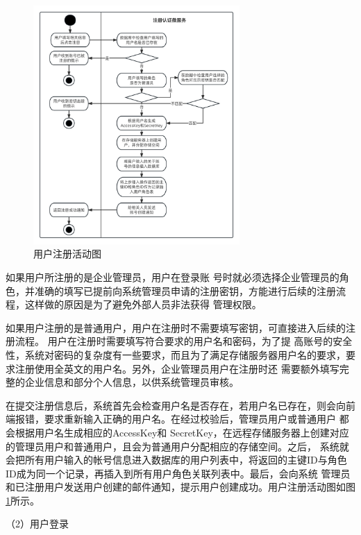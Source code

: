 \begin{figure}[h]
    \centering
    \includegraphics[width=0.7\textwidth]{my_figures/chapter4/用户注册活动图.png}
    \caption{用户注册活动图}
    \label{fig:用户注册活动图}
\end{figure}

如果用户所注册的是企业管理员，用户在登录账
号时就必须选择企业管理员的角色，并准确的填写已提前向系统管理员申请的注册密钥，方能进行后续的注册流程，这样做的原因是为了避免外部人员非法获得
管理权限。

如果用户注册的是普通用户，用户在注册时不需要填写密钥，可直接进入后续的注册流程。
用户在注册时需要填写符合要求的用户名和密码，为了提
高账号的安全性，系统对密码的复杂度有一些要求，而且为了满足存储服务器用户名的要求，要求注册使用全英文的用户名。另外，企业管理员用户在注册时还
需要额外填写完整的企业信息和部分个人信息，以供系统管理员审核。


在提交注册信息后，系统首先会检查用户名是否存在，若用户名已存在，则会向前端报错，要求重新输入正确的用户名。在经过校验后，管理员用户或普通用户
都会根据用户名生成相应的AccessKey和 SecretKey，在远程存储服务器上创建对应的管理员用户和普通用户，且会为普通用户分配相应的存储空间。之后，
系统就会把所有用户输入的帐号信息进入数据库的用户列表中，将返回的主键ID与角色ID成为同一个记录，再插入到所有用户角色关联列表中。最后，会向系统
管理员和已注册用户发送用户创建的邮件通知，提示用户创建成功。用户注册活动图如图\ref{fig:用户注册活动图}所示。

（2）用户登录



